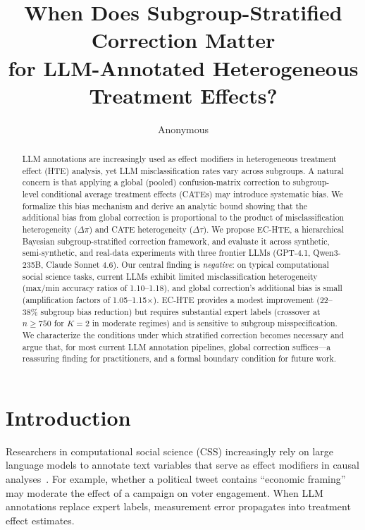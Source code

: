 \documentclass[11pt,a4paper]{article}
\title{When Does Subgroup-Stratified Correction Matter\\for LLM-Annotated Heterogeneous Treatment Effects?}
\author{Anonymous}
\date{}
\begin{document}
\maketitle

\begin{abstract}
LLM annotations are increasingly used as effect modifiers in heterogeneous treatment effect (HTE) analysis, yet LLM misclassification rates vary across subgroups. A natural concern is that applying a global (pooled) confusion-matrix correction to subgroup-level conditional average treatment effects (CATEs) may introduce systematic bias. We formalize this bias mechanism and derive an analytic bound showing that the additional bias from global correction is proportional to the product of misclassification heterogeneity ($\Delta\pi$) and CATE heterogeneity ($\Delta\tau$). We propose EC-HTE, a hierarchical Bayesian subgroup-stratified correction framework, and evaluate it across synthetic, semi-synthetic, and real-data experiments with three frontier LLMs (GPT-4.1, Qwen3-235B, Claude Sonnet 4.6). Our central finding is \emph{negative}: on typical computational social science tasks, current LLMs exhibit limited misclassification heterogeneity (max/min accuracy ratios of 1.10--1.18), and global correction's additional bias is small (amplification factors of 1.05--1.15$\times$). EC-HTE provides a modest improvement (22--38\% subgroup bias reduction) but requires substantial expert labels (crossover at $n \geq 750$ for $K{=}2$ in moderate regimes) and is sensitive to subgroup misspecification. We characterize the conditions under which stratified correction becomes necessary and argue that, for most current LLM annotation pipelines, global correction suffices---a reassuring finding for practitioners, and a formal boundary condition for future work.
\end{abstract}

\section{Introduction}

Researchers in computational social science (CSS) increasingly rely on large language models to annotate text variables that serve as effect modifiers in causal analyses~\citep{egami2024using,ziems2024can}. For example, whether a political tweet contains ``economic framing'' may moderate the effect of a campaign on voter engagement. When LLM annotations replace expert labels, measurement error propagates into treatment effect estimates.
\end{document}

